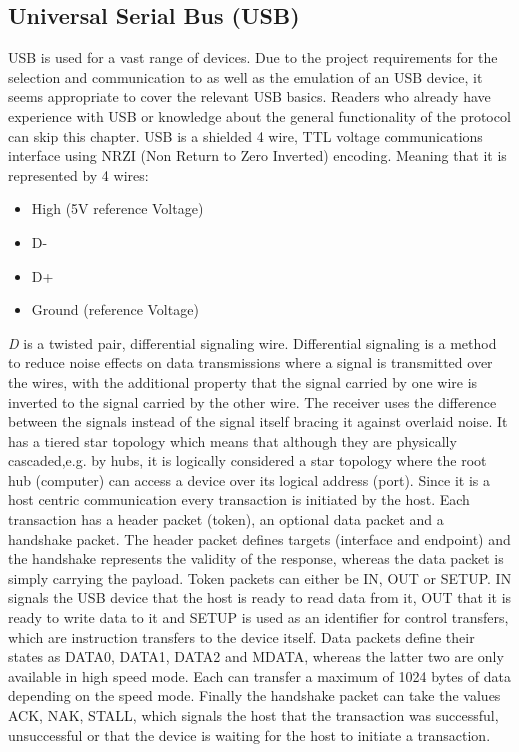 \subsection{Universal Serial Bus (USB)}
USB is used for a vast range of devices. Due to the project requirements for the selection and communication to as well as the emulation of an USB device, it seems appropriate to cover the relevant USB basics. Readers who already have experience with USB or knowledge about the general functionality of the protocol can skip this chapter.
USB is a shielded 4 wire, TTL voltage communications interface using NRZI (Non Return to Zero Inverted) encoding. Meaning that it is represented by 4 wires:
\begin{itemize}
\item High (5V reference Voltage)
\item D-
\item D+
\item Ground (reference Voltage)
\end{itemize}

\emph{D} is a twisted pair, differential signaling wire. Differential signaling is a method to reduce noise effects on data transmissions where a signal is transmitted over the wires, with the additional property that the signal carried by one wire is inverted to the signal carried by the other wire. The receiver uses the difference between the signals instead of the signal itself bracing it against overlaid noise. 
It has a tiered star topology which means that although they are physically cascaded,e.g. by hubs, it is logically considered a star topology where the root hub (computer) can access a device over its logical address (port). 
Since it is a host centric communication every transaction is initiated by the host. Each transaction has a header packet (token), an optional data packet and a handshake packet. The header packet defines targets (interface and endpoint) and the handshake represents the validity of the response, whereas the data packet is simply carrying the payload.
Token packets can either be IN, OUT or SETUP. IN signals the USB device that the host is ready to read data from it, OUT that it is ready to write data to it and SETUP is used as an identifier for control transfers, which are instruction transfers to the device itself.
Data packets define their states as DATA0, DATA1, DATA2 and MDATA, whereas the latter two are only available in high speed mode. Each can transfer a maximum of 1024 bytes of data depending on the speed mode.
Finally the handshake packet can take the values ACK, NAK, STALL, which signals the host that the transaction was successful, unsuccessful or that the device is waiting for the host to initiate a transaction.

